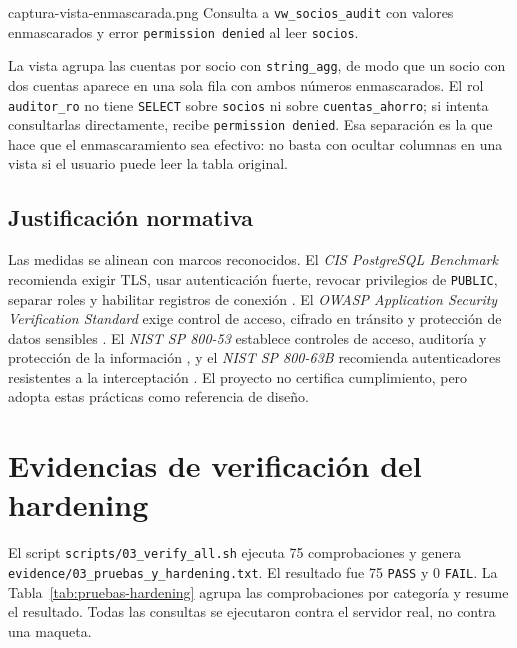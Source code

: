 %
  {captura-vista-enmascarada.png}%
  {Consulta a \texttt{vw\_socios\_audit} con valores enmascarados y error \texttt{permission denied} al leer \texttt{socios}.}

La vista agrupa las cuentas por socio con \texttt{string\_agg}, de modo que un
socio con dos cuentas aparece en una sola fila con ambos números enmascarados.
El rol \texttt{auditor\_ro} no tiene \texttt{SELECT} sobre \texttt{socios} ni
sobre \texttt{cuentas\_ahorro}; si intenta consultarlas directamente, recibe
\texttt{permission denied}. Esa separación es la que hace que el
enmascaramiento sea efectivo: no basta con ocultar columnas en una vista si el
usuario puede leer la tabla original.

\subsection{Justificación normativa}

Las medidas se alinean con marcos reconocidos. El \emph{CIS PostgreSQL
Benchmark} recomienda exigir TLS, usar autenticación fuerte, revocar
privilegios de \texttt{PUBLIC}, separar roles y habilitar registros de
conexión \citep{cis2024postgres}. El \emph{OWASP Application Security
Verification Standard} exige control de acceso, cifrado en tránsito y
protección de datos sensibles \citep{owasp2023asvs}. El \emph{NIST SP 800-53}
establece controles de acceso, auditoría y protección de la información
\citep{nist80053}, y el \emph{NIST SP 800-63B} recomienda autenticadores
resistentes a la interceptación \citep{nist80063b}. El proyecto no certifica
cumplimiento, pero adopta estas prácticas como referencia de diseño.

\section{Evidencias de verificación del hardening}
\label{sec:evidencias-hardening}

El script \texttt{scripts/03\_verify\_all.sh} ejecuta 75 comprobaciones y
genera \texttt{evidence/03\_pruebas\_y\_hardening.txt}. El resultado fue
75 \texttt{PASS} y 0 \texttt{FAIL}. La Tabla~\ref{tab:pruebas-hardening}
agrupa las comprobaciones por categoría y resume el resultado. Todas las
consultas se ejecutaron contra el servidor real, no contra una maqueta.

